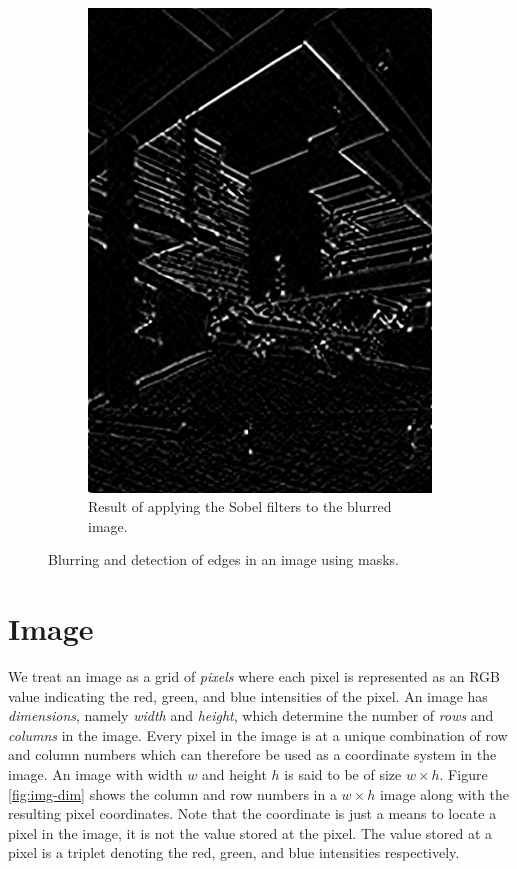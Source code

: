 \documentclass[addpoints]{exam}
\begin{document}
\begin{figure}
\begin{subfigure}[c]{.31\textwidth}
      \includegraphics[width=\textwidth]{campus-edge-detect}
      \caption{Result of applying the Sobel filters to the blurred image.}\label{fig:mask-edge}
    \end{subfigure}
    \caption{Blurring and detection of edges in an image using masks.}
    \label{fig:mask-apply}
  \end{figure}

  \section{Image}

  We treat an image as a grid of \textit{pixels} where each pixel is represented as an RGB value indicating the red, green, and blue intensities of the pixel. An image has \textit{dimensions}, namely \textit{width} and \textit{height}, which determine the number of \textit{rows} and \textit{columns} in the image. Every pixel in the image is at a unique combination of row and column numbers which can therefore be used as a coordinate system in the image. An image with width $w$ and height $h$ is said to be of size $w\times h$. Figure \ref{fig:img-dim} shows the column and row numbers in a $w\times h$ image along with the resulting pixel coordinates. Note that the coordinate is just a means to locate a pixel in the image, it is not the value stored at the pixel. The value stored at a pixel is a triplet denoting the red, green, and blue intensities respectively.
\end{document}
